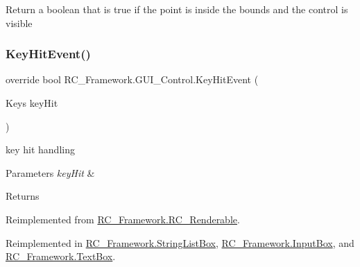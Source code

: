 Return a boolean that is true if the point is inside the bounds and the control is visible 

\mbox{\label{class_r_c___framework_1_1_g_u_i___control_a458eb00bda180db22ebe22e550a669a4}} 
\subsubsection{\texorpdfstring{Key\+Hit\+Event()}{KeyHitEvent()}}
{\footnotesize\ttfamily override bool R\+C\+\_\+\+Framework.\+G\+U\+I\+\_\+\+Control.\+Key\+Hit\+Event (\begin{DoxyParamCaption}\item[{Keys}]{key\+Hit }\end{DoxyParamCaption})\hspace{0.3cm}{\ttfamily [virtual]}}



key hit handling 


\begin{DoxyParams}{Parameters}
{\em key\+Hit} & \\
\hline
\end{DoxyParams}
\begin{DoxyReturn}{Returns}

\end{DoxyReturn}


Reimplemented from \mbox{\hyperlink{class_r_c___framework_1_1_r_c___renderable_a826da9b07316c475186e4c2f00648827}{R\+C\+\_\+\+Framework.\+R\+C\+\_\+\+Renderable}}.



Reimplemented in \mbox{\hyperlink{class_r_c___framework_1_1_string_list_box_a8b449ef1c2c786786b7e6cf52f416750}{R\+C\+\_\+\+Framework.\+String\+List\+Box}}, \mbox{\hyperlink{class_r_c___framework_1_1_input_box_a07ef881a281e4da95994e54ec1f7b496}{R\+C\+\_\+\+Framework.\+Input\+Box}}, and \mbox{\hyperlink{class_r_c___framework_1_1_text_box_ae8c28e507b2c91aa042e2a5c2a300598}{R\+C\+\_\+\+Framework.\+Text\+Box}}.

\mbox{\label{class_r_c___framework_1_1_g_u_i___control_a005e7f109afd21abd6576fdf70212af5}} 
